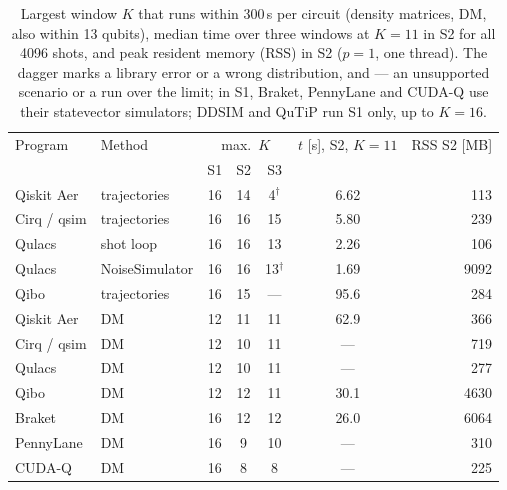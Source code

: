 \begin{table}[t]
\caption{Largest window $K$ that runs within 300\,s per circuit (density matrices, DM, also within 13 qubits), median time over three windows at $K = 11$ in S2 for all 4096 shots, and peak resident memory (RSS) in S2 ($p = 1$, one thread). The dagger marks a library error or a wrong distribution, and --- an unsupported scenario or a run over the limit; in S1, Braket, PennyLane and CUDA-Q use their statevector simulators; DDSIM and QuTiP run S1 only, up to $K = 16$.}
\label{tab:t6}
\centering
\small
\begin{tabular}{llccccr}
\toprule
Program & Method & \multicolumn{3}{c}{max.\ $K$} & $t$ [s], S2, $K = 11$ & RSS S2 [MB] \\
 & & S1 & S2 & S3 & & \\
\midrule
Qiskit Aer & trajectories & 16 & 14 & 4$^\dagger$ & 6.62 & 113 \\
Cirq / qsim & trajectories & 16 & 16 & 15 & 5.80 & 239 \\
Qulacs & shot loop & 16 & 16 & 13 & 2.26 & 106 \\
Qulacs & NoiseSimulator & 16 & 16 & 13$^\dagger$ & 1.69 & 9092 \\
Qibo & trajectories & 16 & 15 & --- & 95.6 & 284 \\
Qiskit Aer & DM & 12 & 11 & 11 & 62.9 & 366 \\
Cirq / qsim & DM & 12 & 10 & 11 & --- & 719 \\
Qulacs & DM & 12 & 10 & 11 & --- & 277 \\
Qibo & DM & 12 & 12 & 11 & 30.1 & 4630 \\
Braket & DM & 16 & 12 & 12 & 26.0 & 6064 \\
PennyLane & DM & 16 & 9 & 10 & --- & 310 \\
CUDA-Q & DM & 16 & 8 & 8 & --- & 225 \\
\bottomrule
\end{tabular}
\end{table}
